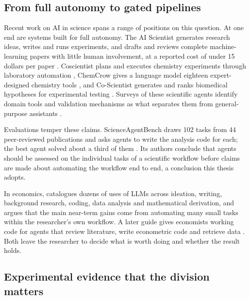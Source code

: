 \subsection{From full autonomy to gated pipelines}

Recent work on AI in science spans a range of positions on this question.
At one end are systems built for full autonomy.
The AI Scientist generates research ideas, writes and runs experiments, and drafts and reviews complete machine-learning papers with little human involvement, at a reported cost of under 15 dollars per paper \citep{lu2024ai}.
Coscientist plans and executes chemistry experiments through laboratory automation \citep{boiko2023autonomous}, ChemCrow gives a language model eighteen expert-designed chemistry tools \citep{bran2024augmenting}, and Co-Scientist generates and ranks biomedical hypotheses for experimental testing \citep{gottweis2026accelerating}.
Surveys of these scientific agents identify domain tools and validation mechanisms as what separates them from general-purpose assistants \citep{ren2025towards}.

Evaluations temper these claims.
ScienceAgentBench draws 102 tasks from 44 peer-reviewed publications and asks agents to write the analysis code for each; the best agent solved about a third of them \citep{chen2025scienceagentbench}.
Its authors conclude that agents should be assessed on the individual tasks of a scientific workflow before claims are made about automating the workflow end to end, a conclusion this thesis adopts.

In economics, \citet{korinek2023generative} catalogues dozens of uses of LLMs across ideation, writing, background research, coding, data analysis and mathematical derivation, and argues that the main near-term gains come from automating many small tasks within the researcher's own workflow.
A later guide gives economists working code for agents that review literature, write econometric code and retrieve data \citep{korinek2025ai}.
Both leave the researcher to decide what is worth doing and whether the result holds.

\subsection{Experimental evidence that the division matters}

